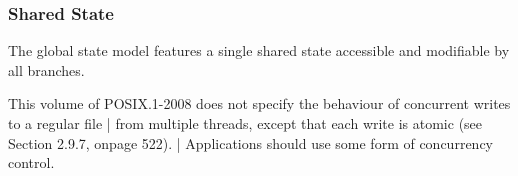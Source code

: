 \documentclass[logo,bsc,singlespacing,parskip]{infthesis}
\begin{document}
\subsubsection*{Shared State} 
The global state model features a single shared state accessible and modifiable by all branches.

\begin{tcolorbox}[colback=gray!10, colframe=gray!60, sharp corners, boxrule=0.5pt, title={POSIX Base Specifications, Issue 7, p.2316}]
 This volume of POSIX.1-2008 does not specify the behaviour of concurrent writes to a regular file |
 from multiple threads, except that each write is atomic (see Section 2.9.7, onpage 522). |
 Applications should use some form of concurrency control.
\end{tcolorbox}
\end{document}
